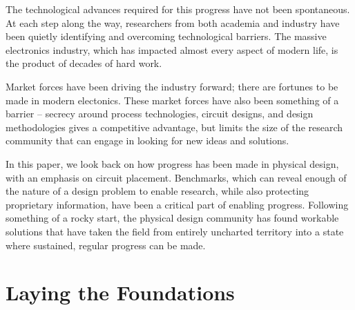 \documentclass[sigconf]{acmart}
\begin{document}
The technological advances required for this progress
have not been spontaneous.  At each
step along the way, researchers from both academia and
industry have been quietly identifying and overcoming
technological barriers.  The massive electronics industry,
which has impacted almost every aspect of modern life,
is the product of decades of hard work.

Market forces have been driving the industry forward; there are
fortunes to be made in modern electonics.  These market forces have
also been something of a barrier -- secrecy around process
technologies, circuit designs, and design methodologies gives a
competitive advantage, but limits the size of the research community
that can engage in looking for new ideas and solutions.

In this paper, we look back on how progress has been made
in physical design, with an emphasis on circuit placement.
Benchmarks, which can reveal enough of the nature of a design
problem to enable research, while also protecting proprietary
information, have been a critical part of enabling progress.
Following something of a rocky start, the physical design
community has found workable solutions that have taken the field
from entirely uncharted territory into a state where sustained,
regular progress can be made.


\iffalse
{\bf How to say this?
  Economic driver pushing technology forward.  Lots of
  companies competing for market share.  Secrecy on
  design technology, circuit designs, gives a competitive
  advantage -- but also limits the number of people who
  can solve the problems that need to be solved.

  For academic researchers in particular to be helpful,
  details of the problems needing solving have to be
  available.  Without test cases, and things that are
  suitable for publication, they cannot assist.
}




Making progress in design automation has been challenging;
the problems addressed are fundamentally hard from a scientific
perspective. Complicating matters further are the financial
implications -- semiconductor manufacturers, design tool companies,
and circuit designers, are all interested in making profits, and
this depends on some degree of secrecy in their work.  At the
same time, solving design problems requires assistance from
others.
\fi


\section{Laying the Foundations}
\end{document}
